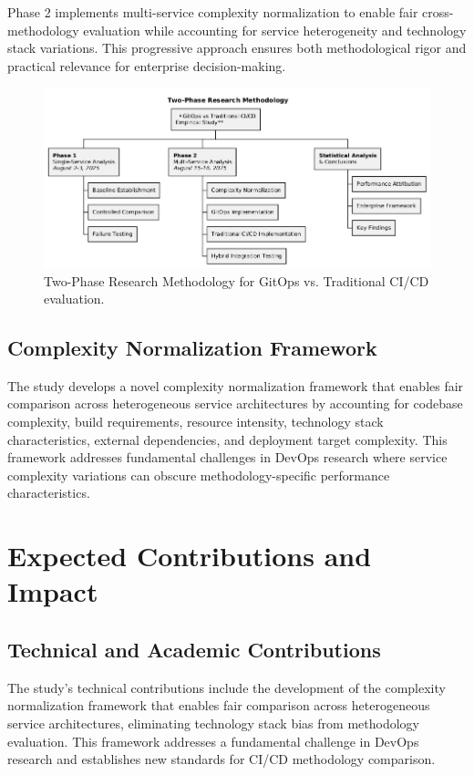 Phase 2 implements multi-service complexity normalization to enable fair cross-methodology evaluation while accounting for service heterogeneity and technology stack variations. This progressive approach ensures both methodological rigor and practical relevance for enterprise decision-making.

\begin{figure}[H]
\centering
\includegraphics[width=\textwidth]{figures/research-methodology.png}
\caption{Two-Phase Research Methodology for GitOps vs. Traditional CI/CD evaluation.}
\label{fig:research_methodology}
\end{figure}

\subsection{Complexity Normalization Framework}
The study develops a novel complexity normalization framework that enables fair comparison across heterogeneous service architectures by accounting for codebase complexity, build requirements, resource intensity, technology stack characteristics, external dependencies, and deployment target complexity. This framework addresses fundamental challenges in DevOps research where service complexity variations can obscure methodology-specific performance characteristics.

\section{Expected Contributions and Impact}

\subsection{Technical and Academic Contributions}

The study's technical contributions include the development of the complexity normalization framework that enables fair comparison across heterogeneous service architectures, eliminating technology stack bias from methodology evaluation. This framework addresses a fundamental challenge in DevOps research and establishes new standards for CI/CD methodology comparison.

